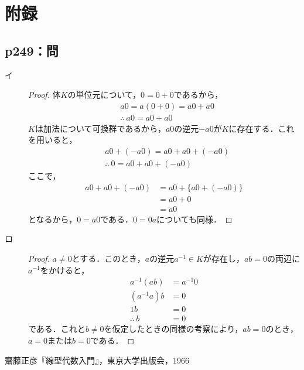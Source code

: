 \documentclass[uplatex,dvipdfmx,a4paper,11pt,fleqn]{jsarticle}
\begin{document}
\section*{附録\three}


\subsection*{p249：問}

\begin{tleftbar}
\begin{description}
    \item[イ] 
	\begin{proof}
		体$K$の単位元について，$0=0+0$であるから，
		\begin{align*}
			&a 0=a(0+0)=a0 + a0\\
			&\therefore ~ a0 = a0 + a0
		\end{align*}
		$K$は加法について可換群であるから，$a0$の逆元$-a0$が$K$に存在する．これを用いると，
\begin{align*}
	&a0 + (-a0) = a0 + a0 + (-a0) \\
	&\therefore ~ 0 = a0 + a0 +(-a0)
\end{align*}
 ここで，
 \begin{align*}
	a0 + a0 +(-a0)&=a0+ \{a0+(-a0)\} \\
	& = a0 + 0 \\
	& = a0
 \end{align*}
となるから，$0=a0$である．$0=0a$についても同様．
\end{proof}
\item[ロ]
\begin{proof}
        $a \ne 0$とする．このとき，$a$の逆元$a^{-1} \in K$が存在し，$ab=0$の両辺に$a^{-1}$をかけると，
        \begin{align*}
            a^{-1} (ab) &= a^{-1} 0 \\
            (a^{-1}a)b &=0 \\
            1b &=0 \\
            \therefore~ b&=0
        \end{align*}
        である．これと$b \ne 0$を仮定したときの同様の考察により，$ab=0$のとき，$a=0$または$b=0$である．
    \end{proof}
    \end{description}
\end{tleftbar}

\begin{thebibliography}{9}
	 齋藤正彦『線型代数入門』，東京大学出版会，1966
\end{thebibliography}
\end{document}
